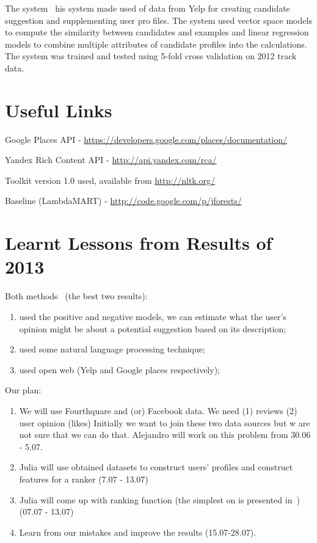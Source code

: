 \documentclass{llncs}
\begin{document}
The system~\cite{Jiang_2013} his system made used of data from Yelp for creating candidate suggestion and supplementing user profiles. The system used vector space models to compute the similarity between candidates and examples and linear
regression models to combine multiple attributes of candidate profiles into the calculations. The system was
trained and tested using 5-fold cross validation on 2012 track data.

\section{Useful Links}

Google Places API - \url{https://developers.google.com/places/documentation/}

Yandex Rich Content API - \url{http://api.yandex.com/rca/}

Toolkit version 1.0 used, available from \url{http://nltk.org/}

Baseline (LambdaMART) - \url{http://code.google.com/p/jforests/}

\section{Learnt Lessons from Results of 2013}
Both methods~\cite{Yang_2013,Rikitianskii_2013} (the best two results):
\begin{enumerate}
\item used the positive and negative models, we can estimate what the user's opinion might be about a potential suggestion based on its description;
\item used some natural language processing technique;
\item used open web (Yelp and Google places respectively);
\end{enumerate}

Our plan:
\begin{enumerate}
\item We will use Fourthquare and (or) Facebook data. We need (1) reviews (2) user opinion (likes) Initially we want to join these two data sources but w are not sure that we can do that. Alejandro will work on this problem from  30.06 - 5.07.
\item Julia will use obtained datasets to construct users' profiles and construct features for a ranker (7.07 - 13.07)
\item Julia will come up with ranking function (the simplest on is presented in~\cite{Yang_2013}) (07.07 - 13.07)
\item Learn from our mistakes and improve the results (15.07-28.07).
\end{enumerate}	



\end{document}
